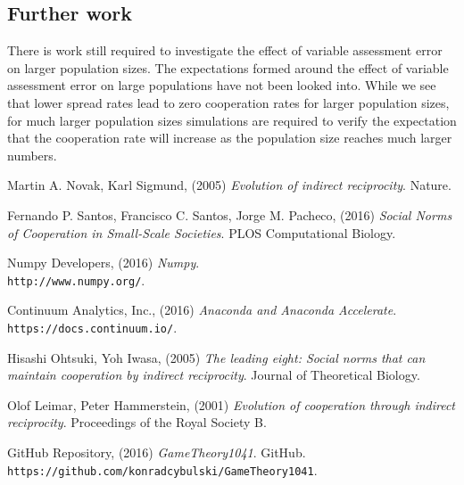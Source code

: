 \documentclass[10pt,a4paper]{article}
\begin{document}
\subsection{Further work}
There is work still required to investigate the effect of variable assessment error on larger population sizes.
The expectations formed around the effect of variable assessment error on large populations have not been looked into.
While we see that lower spread rates lead to zero cooperation rates for larger population sizes, for much larger population sizes simulations are required to verify the expectation that the cooperation rate will increase as the population size reaches much larger numbers.

\pagebreak
\begin{thebibliography}{9}

Martin A. Novak, Karl Sigmund, (2005) 
\textit{Evolution of indirect reciprocity}. 
Nature.

Fernando P. Santos, Francisco C. Santos, Jorge M. Pacheco, (2016) 
\textit{Social Norms of Cooperation in Small-Scale Societies}. 
PLOS Computational Biology.

Numpy Developers, (2016) 
\textit{Numpy}. 
\\\texttt{http://www.numpy.org/}.

Continuum Analytics, Inc., (2016) 
\textit{Anaconda and Anaconda Accelerate}. 
\\\texttt{https://docs.continuum.io/}.

Hisashi Ohtsuki, Yoh Iwasa, (2005) 
\textit{The leading eight: Social norms that can maintain cooperation by indirect reciprocity}. 
Journal of Theoretical Biology.

Olof Leimar, Peter Hammerstein, (2001) 
\textit{Evolution of cooperation through indirect reciprocity}. 
Proceedings of the Royal Society B.

GitHub Repository, (2016) 
\textit{GameTheory1041}. GitHub.
\\\texttt{https://github.com/konradcybulski/GameTheory1041}.

\end{thebibliography}
\end{document}
